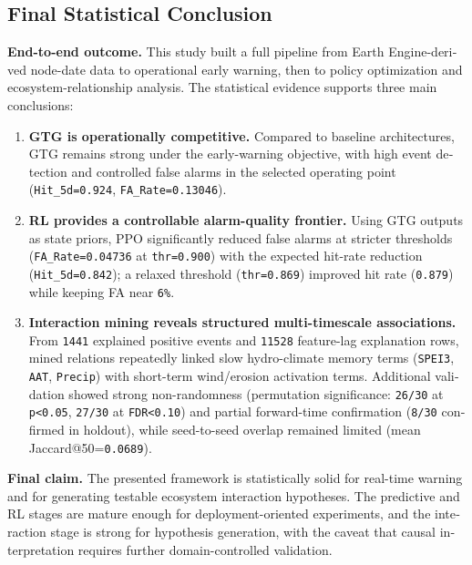 \documentclass[12pt,a4paper]{article}
\begin{document}
\begin{latin}
\section{Final Statistical Conclusion}
\noindent\textbf{End-to-end outcome.}
This study built a full pipeline from Earth Engine-derived node-date data to operational early warning, then to policy optimization and ecosystem-relationship analysis.
The statistical evidence supports three main conclusions:
\begin{enumerate}
\item \textbf{GTG is operationally competitive.}  
Compared to baseline architectures, GTG remains strong under the early-warning objective, with high event detection and controlled false alarms in the selected operating point (\texttt{Hit\_5d=0.924}, \texttt{FA\_Rate=0.13046}).

\item \textbf{RL provides a controllable alarm-quality frontier.}  
Using GTG outputs as state priors, PPO significantly reduced false alarms at stricter thresholds (\texttt{FA\_Rate=0.04736} at \texttt{thr=0.900}) with the expected hit-rate reduction (\texttt{Hit\_5d=0.842}); a relaxed threshold (\texttt{thr=0.869}) improved hit rate (\texttt{0.879}) while keeping FA near \texttt{6\%}.

\item \textbf{Interaction mining reveals structured multi-timescale associations.}  
From \texttt{1441} explained positive events and \texttt{11528} feature-lag explanation rows, mined relations repeatedly linked slow hydro-climate memory terms (\texttt{SPEI3}, \texttt{AAT}, \texttt{Precip}) with short-term wind/erosion activation terms.
Additional validation showed strong non-randomness (permutation significance: \texttt{26/30} at \texttt{p<0.05}, \texttt{27/30} at \texttt{FDR<0.10}) and partial forward-time confirmation (\texttt{8/30} confirmed in holdout), while seed-to-seed overlap remained limited (mean Jaccard@50=\texttt{0.0689}).
\end{enumerate}

\noindent\textbf{Final claim.}
The presented framework is statistically solid for real-time warning and for generating testable ecosystem interaction hypotheses.
The predictive and RL stages are mature enough for deployment-oriented experiments, and the interaction stage is strong for hypothesis generation, with the caveat that causal interpretation requires further domain-controlled validation.
\end{latin}
\end{document}

